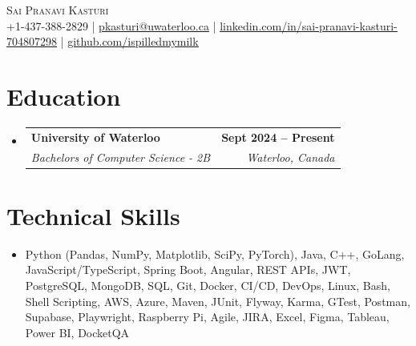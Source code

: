 \documentclass[letterpaper,11pt]{article}
\makeatletter
\newcommand{\resumeSubheading}[4]{
  \vspace{-1pt}\item
    \begin{tabular*}{1.0\textwidth}[t]{l@{\extracolsep{\fill}}r}
      \textbf{#1} & \textbf{\small #2} \\
      \textit{\small#3} & \textit{\small #4} \\[-2pt]
    \end{tabular*}\vspace{-1pt}
}
\newcommand{\resumeSubHeadingListStart}{\begin{itemize}[leftmargin=0.0in, label={}]}
\newcommand{\resumeSubHeadingListEnd}{\end{itemize}}
\makeatother
\begin{document}

\vspace{-16pt}
\begin{center}
    {\Huge \scshape Sai Pranavi Kasturi} \\ 
    
    \small +1-437-388-2829 | \underline{pkasturi@uwaterloo.ca} | \href{https://linkedin.com/in/sai-pranavi-kasturi-704807298}{\underline{linkedin.com/in/sai-pranavi-kasturi-704807298}} | \href{https://github.com/ispilledmymilk}{\underline{github.com/ispilledmymilk}}
\end{center}

\vspace{-2pt}
\section{Education}
  \resumeSubHeadingListStart
    \resumeSubheading
      {University of Waterloo}{Sept 2024 -- Present}
      {Bachelors of Computer Science - 2B}{Waterloo, Canada}
      
  \resumeSubHeadingListEnd
  

\section{Technical Skills}
\begin{itemize}[leftmargin=0.05in, label={}]
  \small\item{
    Python (Pandas, NumPy, Matplotlib, SciPy, PyTorch), Java, C++, GoLang, JavaScript/TypeScript, Spring Boot, Angular, REST APIs, JWT, PostgreSQL, MongoDB, SQL, Git, Docker, CI/CD, DevOps, Linux, Bash, Shell Scripting, AWS, Azure, Maven, JUnit, Flyway, Karma, GTest, Postman, Supabase, Playwright, Raspberry Pi, Agile, JIRA, Excel, Figma, Tableau, Power BI, DocketQA
  }
\end{itemize}
 \vspace{-4pt}
\end{document}
